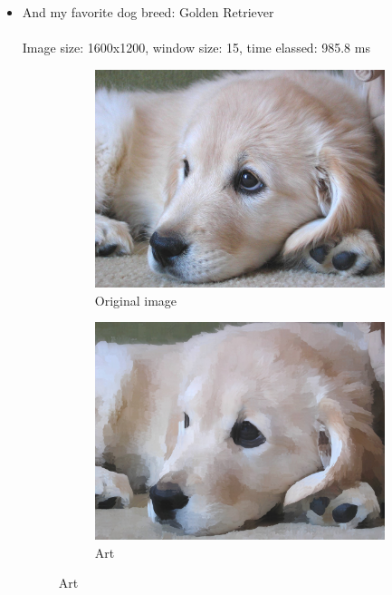 \documentclass[12pt]{article}
\begin{document}
\begin{itemize}
  \item And my favorite dog breed: Golden Retriever
  \\\\
  Image size: 1600x1200, window size: 15, time elassed: 985.8 ms

  \begin{figure}[H]
    \centering
    \begin{subfigure}{.45\textwidth}
      \includegraphics[width=\linewidth]{./img/2_in.jpg}
      \caption{Original image}
    \end{subfigure}
    \hspace{1cm}
    \begin{subfigure}{.45\textwidth}
      \includegraphics[width=\linewidth]{./img/2_out.jpg}
      \caption{Art}
    \end{subfigure}
  \end{figure}
\end{itemize}
\end{document}
